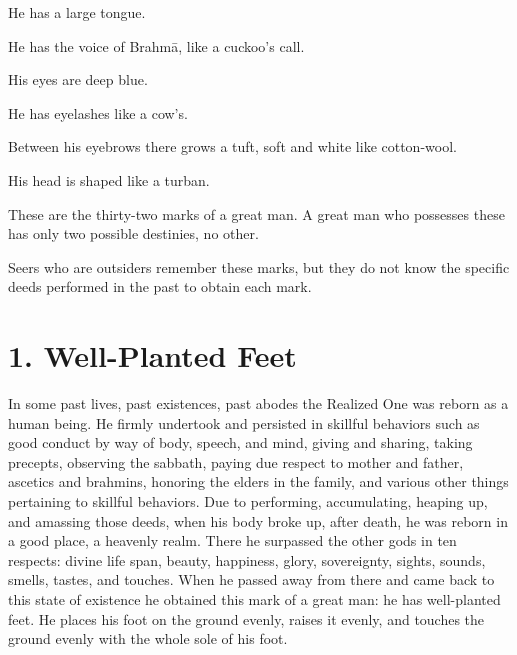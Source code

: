 \documentclass[12pt,openany]{book}%
\begin{document}
He has a large tongue. 

He has the voice of \textsanskrit{Brahmā}, like a cuckoo’s call. 

His eyes are deep blue. 

He has eyelashes like a cow’s. 

Between his eyebrows there grows a tuft, soft and white like cotton-wool. 

His head is shaped like a turban. 

These are the thirty-two marks of a great man. A great man who possesses these has only two possible destinies, no other. 

Seers who are outsiders remember these marks, but they do not know the specific deeds performed in the past to obtain each mark. 

\section*{1. Well-Planted Feet }

In some past lives, past existences, past abodes the Realized One was reborn as a human being. He firmly undertook and persisted in skillful behaviors such as good conduct by way of body, speech, and mind, giving and sharing, taking precepts, observing the sabbath, paying due respect to mother and father, ascetics and brahmins, honoring the elders in the family, and various other things pertaining to skillful behaviors. Due to performing, accumulating, heaping up, and amassing those deeds, when his body broke up, after death, he was reborn in a good place, a heavenly realm. There he surpassed the other gods in ten respects: divine life span, beauty, happiness, glory, sovereignty, sights, sounds, smells, tastes, and touches. When he passed away from there and came back to this state of existence he obtained this mark of a great man: he has well-planted feet. He places his foot on the ground evenly, raises it evenly, and touches the ground evenly with the whole sole of his foot. 
\end{document}
